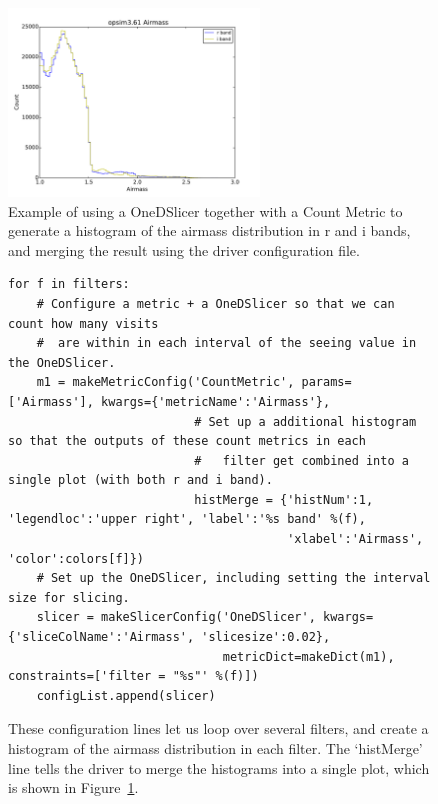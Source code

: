 \documentclass[]{spie}  %
\begin{document}
\begin{figure}
\centering
\includegraphics[height=5cm]{figures/opsim3_61__opsim3_61_Airmass_ONED_Histogram}
\caption[]
{ \label{fig:OneD}Example of using a OneDSlicer together with a Count
Metric to generate a histogram of the airmass distribution in r and i
bands, and merging the result using the driver configuration file. 
}
\end{figure}

\begin{figure}
\centering
\begin{lstlisting}[frame=single]
for f in filters:
    # Configure a metric + a OneDSlicer so that we can count how many visits 
    #  are within in each interval of the seeing value in the OneDSlicer. 
    m1 = makeMetricConfig('CountMetric', params=['Airmass'], kwargs={'metricName':'Airmass'},
                          # Set up a additional histogram so that the outputs of these count metrics in each
                          #   filter get combined into a single plot (with both r and i band). 
                          histMerge = {'histNum':1, 'legendloc':'upper right', 'label':'%s band' %(f),
                                       'xlabel':'Airmass', 'color':colors[f]})
    # Set up the OneDSlicer, including setting the interval size for slicing.
    slicer = makeSlicerConfig('OneDSlicer', kwargs={'sliceColName':'Airmass', 'slicesize':0.02},
                              metricDict=makeDict(m1), constraints=['filter = "%s"' %(f)])
    configList.append(slicer)
\end{lstlisting}
\caption[]
{\label{fig:oneDdriver}These configuration lines let us loop over
  several filters, and create a histogram of the airmass distribution
  in each filter. The `histMerge' line tells the driver to merge the
  histograms into a single plot, which is shown in Figure~\ref{fig:OneD}.}
\end{figure}
\end{document}
